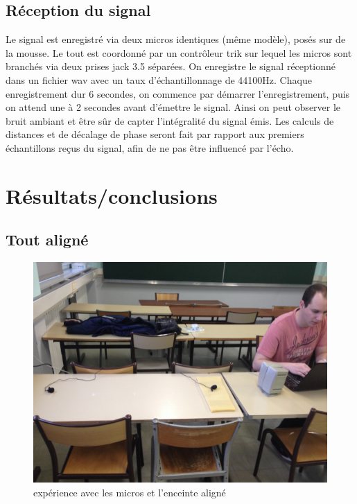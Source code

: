 \documentclass[12pt,a4paper]{report}
\begin{document}
\subsection{Réception du signal}
Le signal est enregistré via deux micros identiques (même modèle), posés sur de la mousse. Le tout est coordonné par un contrôleur trik sur lequel les micros sont branchés via deux prises jack 3.5 séparées.
On enregistre le signal réceptionné dans un fichier wav avec un taux d'échantillonnage de 44100Hz.
Chaque enregistrement dur 6 secondes, on commence par démarrer l'enregistrement, puis on attend une à 2 secondes avant d'émettre le signal. Ainsi on peut observer le bruit ambiant et être sûr de capter l'intégralité du signal émis.
Les calculs de distances et de décalage de phase seront fait par rapport aux premiers échantillons reçus du signal, afin de ne pas être influencé par l'écho.

\section{Résultats/conclusions}
\subsection{Tout aligné}
\begin{figure}[H]
\includegraphics[width=\textwidth]{../tests/test_du_protocole/micros_alignes.jpg} 
\caption{expérience avec les micros et l'enceinte aligné}
\end{figure}
\end{document}
